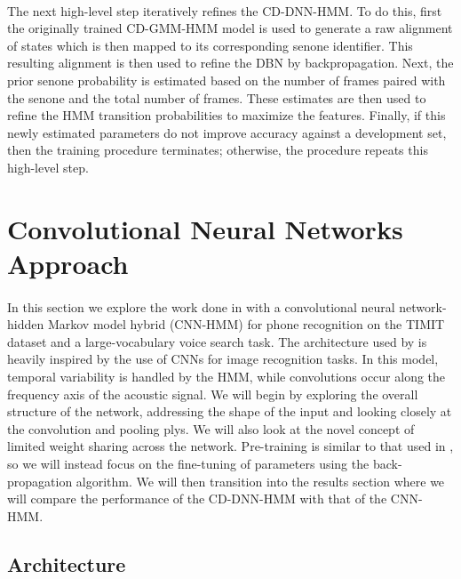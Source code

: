 \documentclass[letterpaper]{article}
\begin{document}
\paragraph{} The next high-level step iteratively refines the CD-DNN-HMM. To do this, first the originally trained CD-GMM-HMM model is used to generate a raw alignment of states which is then mapped to its corresponding senone identifier. This resulting alignment is then used to refine the DBN by backpropagation. Next, the prior senone probability is estimated based on the number of frames paired with the senone and the total number of frames. These estimates are then used to refine the HMM transition probabilities to maximize the features. Finally, if this newly estimated parameters do not improve accuracy against a development set, then the training procedure terminates; otherwise, the procedure repeats this high-level step.

\section*{Convolutional Neural Networks Approach}

\paragraph{} In this section we explore the work done in \cite{DBLP:journals/taslp/Abdel-HamidMJDPY14} with a convolutional neural network-hidden Markov model hybrid (CNN-HMM) for phone recognition on the TIMIT dataset and a large-vocabulary voice search task. The architecture used by \cite{DBLP:journals/taslp/Abdel-HamidMJDPY14} is heavily inspired by the use of CNNs for image recognition tasks. In this model, temporal variability is handled by the HMM, while convolutions occur along the frequency axis of the acoustic signal. We will begin by exploring the overall structure of the network, addressing the shape of the input and looking closely at the convolution and pooling plys. We will also look at the novel concept of limited weight sharing across the network. Pre-training is similar to that used in \cite{DBLP:journals/taslp/DahlYDA12}, so we will instead focus on the fine-tuning of parameters using the back-propagation algorithm. We will then transition into the results section where we will compare the performance of the CD-DNN-HMM with that of the CNN-HMM.

\subsection*{Architecture}
\end{document}
